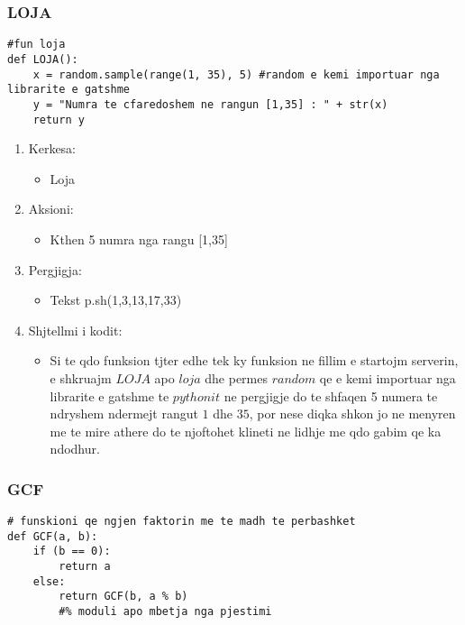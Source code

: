 \documentclass[]{article}
\begin{document}
\subsubsection{LOJA}
\begin{lstlisting}
#fun loja
def LOJA():
    x = random.sample(range(1, 35), 5) #random e kemi importuar nga librarite e gatshme
    y = "Numra te cfaredoshem ne rangun [1,35] : " + str(x)
    return y
\end{lstlisting}
\begin{enumerate}
\item Kerkesa:
\begin{itemize}
\item Loja
\end{itemize}
\item Aksioni:
\begin{itemize}
\item Kthen 5 numra nga rangu [1,35]
\end{itemize}
\item Pergjigja:
\begin{itemize}
\item Tekst p.sh(1,3,13,17,33)
\end{itemize}
\item Shjtellmi i kodit:
\begin{itemize}
\item Si te qdo funksion tjter edhe tek ky funksion ne fillim e startojm serverin, e shkruajm $LOJA$ apo $loja$ dhe permes $random$ qe e kemi importuar nga librarite e gatshme te $pythonit$ ne pergjigje do te shfaqen 5 numera te ndryshem ndermejt rangut $1$ dhe $35$, por nese diqka shkon jo ne menyren me te mire athere do te njoftohet klineti ne lidhje me qdo gabim qe ka ndodhur.


\end{itemize}
\end{enumerate}
\newpage
\subsubsection{GCF}
\begin{lstlisting}
# funskioni qe ngjen faktorin me te madh te perbashket
def GCF(a, b):
    if (b == 0):
        return a
    else:
        return GCF(b, a % b) 
        #% moduli apo mbetja nga pjestimi 
\end{lstlisting}
\end{document}
